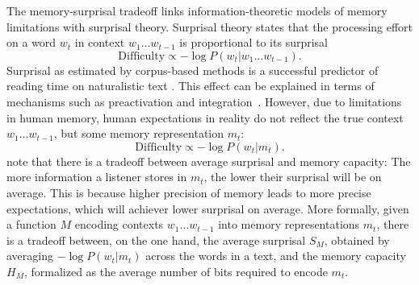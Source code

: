 \documentclass[11pt,letterpaper]{article}
\begin{document}
The memory-surprisal tradeoff links information-theoretic models of memory limitations with surprisal theory.
Surprisal theory \citep{hale2001probabilistic, levy2008expectation} states that the processing effort on a word $w_t$ in context $w_1 ... w_{t-1}$ is proportional to its surprisal
     \begin{equation}   \label{eq:true-surp}
    \text{Difficulty} \propto -\log P(w_t | w_1\dots w_{t-1}).
\end{equation}
Surprisal as estimated by corpus-based methods is a successful predictor of reading time on naturalistic text \citep{smith2013effect,goodkind-predictive-2018,frank2019interaction,aurnhammer2019evaluating,wilcox2020predictive}.
This effect can be explained in terms of mechanisms such as preactivation and integration~\citep{kuperberg2016we}.
However, due to limitations in human memory, human expectations in reality do not reflect the true context $w_1\dots w_{t-1}$, but some memory representation $m_t$:
\begin{equation}   \label{eq:lossy-surp}
    \text{Difficulty} \propto -\log P(w_t | m_t).
\end{equation}
\citet{Hahn2020modeling} note that there is a tradeoff between average surprisal and memory capacity:
The more information a listener stores in $m_t$, the lower their surprisal will be on average.
This is because higher precision of memory leads to more precise expectations, which will achiever lower surprisal on average.
More formally, given a function $M$ encoding contexts $w_1\dots w_{t-1}$ into memory representations $m_t$, there is a tradeoff between, on the one hand, the average surprisal $S_M$, obtained by averaging $-\log P(w_t | m_t)$ across the words in a text, and the memory capacity $H_M$, formalized as the average number of bits required to encode $m_t$.
\end{document}
